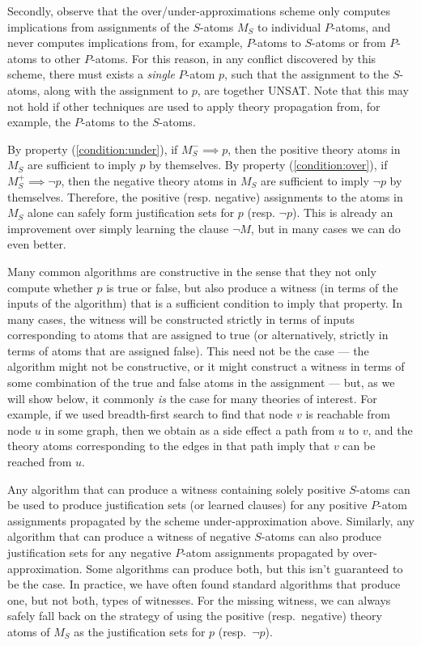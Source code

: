 \documentclass[runningheads]{llncs}
\begin{document}
Secondly, observe that the over/under-approximations scheme only computes implications
from assignments of the $S$-atoms $M_S$ to individual $P$-atoms, and never computes
implications from, for example, $P$-atoms to $S$-atoms or from $P$-atoms to other $P$-atoms.
For this reason, in any conflict discovered by this scheme, there must exists a \textit{single}
$P$-atom $p$, such that the assignment to the $S$-atoms, along with the assignment to $p$, are together UNSAT.
Note that this may not hold if other techniques are used to apply theory propagation from, for
example, the $P$-atoms to the $S$-atoms.

By property
(\ref{condition:under}), if $M_S^- \implies p$, then the
positive theory atoms in $M_S$ are sufficient to imply $p$ by themselves.
By property (\ref{condition:over}), if $M_S^+ \implies \lnot p$, then the
negative theory atoms in $M_S$ are sufficient to imply $\lnot p$ by
themselves. Therefore, the positive (resp. negative) assignments to the atoms in $M_S$ alone
can safely form justification sets for $p$ (resp. $\lnot p$).
This is already an improvement over simply learning the clause $\lnot M$,
but in many cases we can do even better.

Many common algorithms are constructive in the sense that they not only
compute whether $p$ is true or false, but also produce a witness (in terms
of the inputs of the algorithm) that is a sufficient condition to imply
that property. In many cases, the witness will be constructed strictly
in terms of inputs corresponding to atoms that are assigned to true (or
alternatively, strictly in terms of atoms that are assigned false). This
need not be the case --- the algorithm might not be constructive,
or it might construct a witness in terms of some combination of the
true and false atoms in the assignment --- but, as we will show below,
it commonly \textit{is} the case for many theories of interest.  For example,
if we used breadth-first search to find that node $v$ is reachable
from node $u$ in some graph,
then we obtain as a side effect a path from $u$
to $v$, and the theory atoms corresponding to the edges in that path
imply that $v$ can be reached from $u$.

Any algorithm that can produce a witness containing solely
positive $S$-atoms can be used to produce justification sets
(or learned clauses) for any positive $P$-atom assignments propagated
by the scheme under-approximation above. Similarly, any algorithm that
can produce a witness of negative $S$-atoms can also produce
justification sets for any negative $P$-atom assignments propagated by
over-approximation.
Some algorithms can produce both, but this isn't guaranteed to be the case.
In practice, we have often found standard algorithms that produce
one, but not both, types of witnesses.
For the missing witness, we can always safely fall back on the
strategy of using the positive (resp.~negative) theory atoms of $M_S$
as the justification sets for $p$ (resp.~$\lnot p$).
\end{document}
